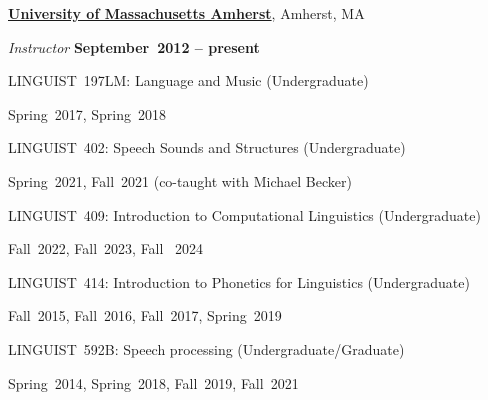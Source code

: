 \documentclass[10pt]{article}
\newcommand{\halfblankline}{\quad\vspace{-0.5\baselineskip}\pagebreak[3]}
\begin{document}
\href{http://www.umass.edu}{\textbf{University of Massachusetts Amherst}},
Amherst, MA
\begin{outerlist}

\item[] \textit{Instructor}%
    \hfill \textbf{September~2012 -- present}
    \begin{innerlist}

        \item LINGUIST~197LM:
          Language and Music (Undergraduate)
        \begin{innerlist}[\enskip$\circ$,leftmargin=*]
            \item Spring~2017, Spring~2018
        \end{innerlist}

        \halfblankline
        \item LINGUIST~402:
          Speech Sounds and Structures (Undergraduate)
        \begin{innerlist}[\enskip$\circ$,leftmargin=*]
            \item Spring~2021, Fall~2021 (co-taught with Michael Becker)
        \end{innerlist}
        \halfblankline

        \halfblankline
        \item LINGUIST~409:
          Introduction to Computational Linguistics (Undergraduate)
        \begin{innerlist}[\enskip$\circ$,leftmargin=*]
            \item Fall~2022, Fall~2023, Fall ~2024
        \end{innerlist}
        \halfblankline

        \item LINGUIST~414:
          Introduction to Phonetics for Linguistics (Undergraduate)
        \begin{innerlist}[\enskip$\circ$,leftmargin=*]
            \item Fall~2015, Fall~2016, Fall~2017, Spring~2019
        \end{innerlist}

        \halfblankline
        \item LINGUIST~592B:
          Speech processing (Undergraduate/Graduate)
        \begin{innerlist}[\enskip$\circ$,leftmargin=*]
            \item Spring~2014, Spring~2018, Fall~2019, Fall~2021
        \end{innerlist}


\end{innerlist}
\end{outerlist}
\end{document}
